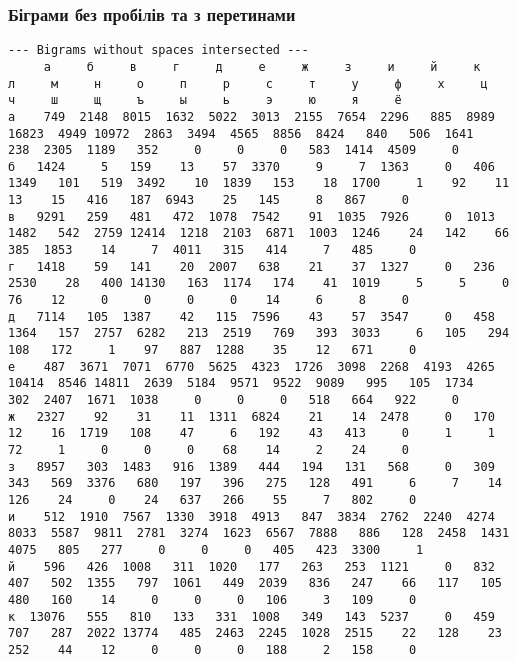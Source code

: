 \documentclass{article}
\begin{document}
\begin{landscape}
\subsubsection{Біграми без пробілів та з перетинами}
	\begin{addmargin}{0em}
	\begin{verbatim}
--- Bigrams without spaces intersected ---
     а     б     в     г     д     е     ж     з     и     й     к     л     м     н     о     п     р     с     т     у     ф     х     ц     ч     ш     щ     ъ     ы     ь     э     ю     я     ё    
а    749  2148  8015  1632  5022  3013  2155  7654  2296   885  8989 16823  4949 10972  2863  3494  4565  8856  8424   840   506  1641   238  2305  1189   352     0     0     0   583  1414  4509     0
б   1424     5   159    13    57  3370     9     7  1363     0   406  1349   101   519  3492    10  1839   153    18  1700     1    92    11    13    15   416   187  6943    25   145     8   867     0
в   9291   259   481   472  1078  7542    91  1035  7926     0  1013  1482   542  2759 12414  1218  2103  6871  1003  1246    24   142    66   385  1853    14     7  4011   315   414     7   485     0
г   1418    59   141    20  2007   638    21    37  1327     0   236  2530    28   400 14130   163  1174   174    41  1019     5     5     0    76    12     0     0     0     0    14     6     8     0
д   7114   105  1387    42   115  7596    43    57  3547     0   458  1364   157  2757  6282   213  2519   769   393  3033     6   105   294   108   172     1    97   887  1288    35    12   671     0
е    487  3671  7071  6770  5625  4323  1726  3098  2268  4193  4265 10414  8546 14811  2639  5184  9571  9522  9089   995   105  1734   302  2407  1671  1038     0     0     0   518   664   922     0
ж   2327    92    31    11  1311  6824    21    14  2478     0   170    12    16  1719   108    47     6   192    43   413     0     1     1    72     1     0     0     0    68    14     2    24     0
з   8957   303  1483   916  1389   444   194   131   568     0   309   343   569  3376   680   197   396   275   128   491     6     7    14   126    24     0    24   637   266    55     7   802     0
и    512  1910  7567  1330  3918  4913   847  3834  2762  2240  4274  8033  5587  9811  2781  3274  1623  6567  7888   886   128  2458  1431  4075   805   277     0     0     0   405   423  3300     1
й    596   426  1008   311  1020   177   263   253  1121     0   832   407   502  1355   797  1061   449  2039   836   247    66   117   105   480   160    14     0     0     0   106     3   109     0
к  13076   555   810   133   331  1008   349   143  5237     0   459   707   287  2022 13774   485  2463  2245  1028  2515    22   128    23   252    44    12     0     0     0   188     2   158     0

\end{verbatim}
\end{addmargin}
\end{landscape}
\end{document}
